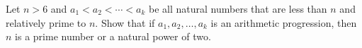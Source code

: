 Let $n > 6$ and $a_1 < a_2 < \cdots < a_k$ be all natural numbers that are less than $n$ and relatively prime to $n$. Show that if $a_1, a_2, \ldots, a_k$ is an arithmetic progression, then $n$ is a prime number or a natural power of two.
